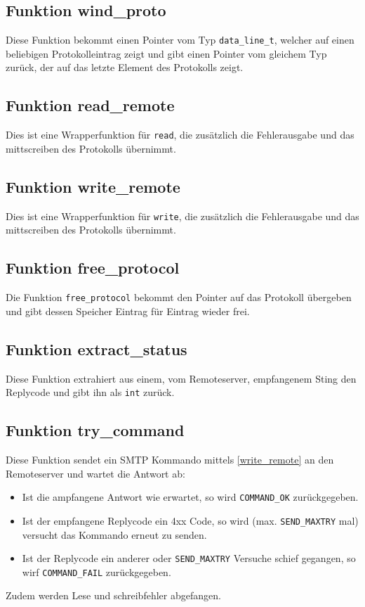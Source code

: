 \documentclass[pdftex,final,a4paper,10pt,notitlepage,halfparskip]{scrreprt}
\begin{document}
\subsection{Funktion wind\_proto}\label{fn:wind_proto}
Diese Funktion bekommt einen Pointer vom Typ \texttt{data\_line\_t}, welcher auf einen beliebigen Protokolleintrag zeigt und gibt einen Pointer vom gleichem Typ zurück, der auf das letzte Element des Protokolls zeigt.

\subsection{Funktion read\_remote}\label{fn:read_remote}
Dies ist eine Wrapperfunktion für \texttt{read}, die zusätzlich die Fehlerausgabe und das mittscreiben des Protokolls übernimmt.

\subsection{Funktion write\_remote}\label{fn:write_remote}
Dies ist eine Wrapperfunktion für \texttt{write}, die zusätzlich die Fehlerausgabe und das mittscreiben des Protokolls übernimmt.

\subsection{Funktion free\_protocol}\label{fn:free_protocol}
Die Funktion \texttt{free\_protocol} bekommt den Pointer auf das Protokoll übergeben und gibt dessen Speicher Eintrag für Eintrag wieder frei.

\subsection{Funktion extract\_status}\label{fn:extract_status}
Diese Funktion extrahiert aus einem, vom Remoteserver, empfangenem Sting den Replycode und gibt ihn als \texttt{int} zurück.

\subsection{Funktion try\_command}\label{fn:try_command}
Diese Funktion sendet ein SMTP Kommando mittels \ref{write_remote} an den Remoteserver und wartet die Antwort ab: 
\begin{itemize}
  \item Ist die ampfangene Antwort wie erwartet, so wird \texttt{COMMAND\_OK} zurückgegeben. 
  \item Ist der empfangene Replycode ein 4xx Code, so wird (max. \texttt{SEND\_MAXTRY} mal) versucht das Kommando erneut zu senden. 
  \item Ist der Replycode ein anderer oder \texttt{SEND\_MAXTRY} Versuche schief gegangen, so wirf \texttt{COMMAND\_FAIL} zurückgegeben.
\end{itemize}
Zudem werden Lese und schreibfehler abgefangen.
\end{document}
